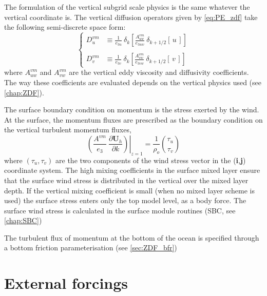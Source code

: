\documentclass[../tex_main/NEMO_manual]{subfiles}
\begin{document}
The formulation of the vertical subgrid scale physics is the same whatever 
the vertical coordinate is. The vertical diffusion operators given by 
\autoref{eq:PE_zdf} take the following semi-discrete space form:
\begin{equation} \label{eq:dynzdf}
\left\{   \begin{aligned}
D_u^{vm} &\equiv \frac{1}{e_{3u}} \ \delta _k \left[ \frac{A_{uw}^{vm} }{e_{3uw} }
                              \ \delta _{k+1/2} [\,u\,]         \right]     \\
\\
D_v^{vm} &\equiv \frac{1}{e_{3v}} \ \delta _k \left[ \frac{A_{vw}^{vm} }{e_{3vw} }
                              \ \delta _{k+1/2} [\,v\,]         \right]
\end{aligned}   \right.
\end{equation} 
where $A_{uw}^{vm} $ and $A_{vw}^{vm} $ are the vertical eddy viscosity and 
diffusivity coefficients. The way these coefficients are evaluated 
depends on the vertical physics used (see \autoref{chap:ZDF}).

The surface boundary condition on momentum is the stress exerted by 
the wind. At the surface, the momentum fluxes are prescribed as the boundary 
condition on the vertical turbulent momentum fluxes,
\begin{equation} \label{eq:dynzdf_sbc}
\left.{\left( {\frac{A^{vm} }{e_3 }\ \frac{\partial \textbf{U}_h}{\partial k}} \right)} \right|_{z=1}
	 = \frac{1}{\rho _o} \binom{\tau _u}{\tau _v }
\end{equation}
where $\left( \tau _u ,\tau _v \right)$ are the two components of the wind stress 
vector in the (\textbf{i},\textbf{j}) coordinate system. The high mixing coefficients 
in the surface mixed layer ensure that the surface wind stress is distributed in 
the vertical over the mixed layer depth. If the vertical mixing coefficient 
is small (when no mixed layer scheme is used) the surface stress enters only 
the top model level, as a body force. The surface wind stress is calculated 
in the surface module routines (SBC, see \autoref{chap:SBC})

The turbulent flux of momentum at the bottom of the ocean is specified through 
a bottom friction parameterisation (see \autoref{sec:ZDF_bfr})

\section{External forcings}
\label{sec:DYN_forcing}
\end{document}
